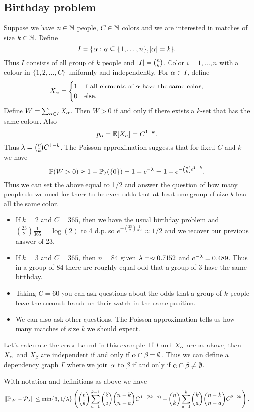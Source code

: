 \subsection{Birthday problem}
Suppose we have $n \in {{\mathbb N}}$ people, $C \in {{\mathbb N}}$ colors and we are interested in matches of size $k \in {{\mathbb N}}$. Define 
\[I = \{{\alpha} : {\alpha} \subseteq \{1,\ldots, n\}, {\left\lvert{\alpha}\right\rvert}=k\}. \] 
Thus $I$ consists of all group of $k$ people and ${\left\lvert I\right\rvert}=\binom{n}{k}$. Color $i = 1,\ldots,n$ with a colour in $\{1,2,\ldots, C\}$ uniformly and independently. For ${\alpha} \in I$, define 
\[X_{\alpha} = \begin{cases}
    1 & \text{if all elements of ${\alpha}$ have the same color},\\
    0&\text{else.}
\end{cases} \]
Define $W = \sum_{{\alpha} \in I} X_{\alpha}$. Then $W > 0$ if and only if there exists a $k$-set that has the same colour. Also
\[p_{\alpha} = {\mathbb{E}}[X_{\alpha}] = C^{1-k}. \]
Thus $\lambda = \binom{n}{k} C^{1-k}$. The Poisson approximation suggests that for fixed $C$ and $k$ we have 
\[{\mathbb{P}}(W > 0) \approx 1-{\mathbb{P}}_\lambda(\{0\}) = 1-e^{-\lambda} = 1-e^{-\binom{n}{k}c^{1-k}}. \]
Thus we can set the above equal to 1/2 and answer the question of how many people do we need for there to be even odds that at least one group of size $k$ has all the same color.
\begin{itemize}
    \item If $k=2$ and $C=365$, then we have the usual birthday problem and $\binom{23}{2}\frac{1}{365} = \log(2)$ to 4 d.p. so $e^{-\binom{23}{2}\frac{1}{365}} \approx 1/2$ and we recover our previous answer of 23.
    \item If $k=3$ and $C=365$, then $n=84$ given $\lambda = \approx 0.7152$ and $e^{-\lambda} = 0.489$. Thus in a group of 84 there are roughly equal odd that a group of 3 have the same birthday.
    \item Taking $C=60$ you can ask questions about the odds that a group of $k$ people have the seconds-hands on their watch in the same position.
    \item We can also ask other questions. The Poisson approximation tells us how many matches of size $k$ we should expect.
\end{itemize}
Let's calculate the error bound in this example. If $I$ and $X_{\alpha}$ are as above, then $X_{\alpha}$ and $X_\beta$ are independent if and only if ${\alpha} \cap \beta = \emptyset$. Thus we can define a dependency graph $\Gamma$ where we join ${\alpha}$ to $\beta$ if and only if ${\alpha} \cap \beta \neq \emptyset$.
\begin{prop}
    With notation and definitions as above we have 
    \[\left\|{\mathbb{P}}_W - {\mathcal{P}}_\lambda\right\| \le \min\{3, 1/\lambda\} \left(\binom{n}{k}\sum_{a=1}^{k-1} \binom{k}{a}\binom{n-k}{n-a} C^{1-(2k-a)}+\binom{n}{k}\sum_{a=1}^{k}\binom{k}{a}\binom{n-k}{n-a} C^{2-2k}\right). \]
\end{prop}
